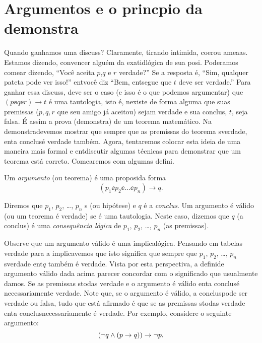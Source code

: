 \section{Argumentos e o princ\ih pio da demonstra\cao}\label{demonstracao}

Quando ganhamos uma discuss\aoi? Claramente, tirando intimida\caoi, coer\cao ou amea\cc as. Estamos dizendo, convencer algu\'em da exatid\ao l\'ogica de sua posi\caoi. Poder\ih amos come\cc ar dizendo, ``Voc\^e aceita $p$,$q$ e $r$ verdade?'' Se a resposta \'e, ``Sim, qualquer pateta pode ver isso!'' ent\ao voc\^e diz ``Bem, ent\ao segue que $t$ deve ser verdade.'' Para ganhar essa discuss\aoi, deve ser o caso (e isso \'e o que podemos argumentar) que $(p\ee q\ee r)\to t$ \'e uma tautologia, isto \'e, n\ao existe de forma alguma que suas premissas ($p,q,r$ que seu amigo j\'a aceitou) sejam verdade e sua conclus\aoi, $t$, seja falsa. \'E assim a prova (demonstra\caoi) de um teorema matem\'atico. Na demonstra\cao devemos mostrar que sempre que as premissas do teorema s\ao verdade, ent\ao a conclus\ao \'e verdade tamb\'em. Agora, tentaremos colocar esta ideia de uma maneira mais formal e ent\ao discutir algumas t\'ecnicas para demonstrar que um teorema est\'a correto. Come\cc aremos com algumas defini\cois. 

Um {\it argumento} (ou teorema) \'e uma proposi\cao da forma
\[
(p_1\ee p_2\ee \ldots \ee p_n)\to q.
\] 

Diremos que $p_1$, $p_2$, \ldots, $p_n$ s (ou hip\'otese) e $q$ \'e a {\it conclus\aoi}. Um argumento \'e v\'alido (ou um teorema \'e verdade) se \'e uma tautologia. Neste caso, dizemos que $q$ (a conclus\aoi) \'e uma {\it consequ\^encia l\'ogica} de $p_1$, $p_2$, \ldots, $p_n$ (as premissas). 

Observe que um argumento v\'alido \'e uma implica\cao l\'ogica. Pensando em tabelas verdade para a implica\cao vemos que isto significa que sempre que $p_1$, $p_2$, \ldots, $p_n$ s\ao verdade ent\ao $q$ tamb\'em \'e verdade. Vista por esta perspectiva, a defini\cao de argumento v\'alido dada acima parecer concordar com o significado que usualmente damos. Se as premissas s\ao todas verdade e o argumento \'e v\'alido ent\ao a conclus\ao \'e necessariamente verdade. Note que, se o argumento \'e v\'alido, a conclus\ao pode ser verdade ou falsa, tudo que est\'a afirmado \'e que se as premissas s\ao todas verdade ent\ao a conclus\ao necessariamente \'e verdade. Por exemplo, considere o seguinte argumento:
\[
(\lnot q \wedge (p\to q))\to \lnot p.
\]

